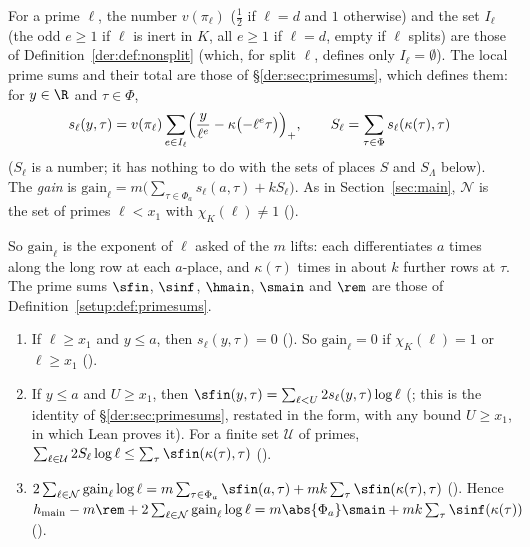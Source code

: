 \begin{definition}
\label{ub-divis:def:gain}
For a prime $\ell$, the number $v(\pi_\ell)$ ($\frac12$ if $\ell=d$ and $1$ otherwise) and the set
$I_\ell$ (the odd $e\ge1$ if $\ell$ is inert in $K$, all $e\ge1$ if $\ell=d$, empty if $\ell$ splits)
are those of Definition~\ref{der:def:nonsplit} (which, for split $\ell$, defines only $I_\ell=\emptyset$).
The local prime sums and their total are those of
\S\ref{der:sec:primesums}, which defines them: for $y\in\R$ and $\tau\in\Phi$,
\[
s_\ell(y,\tau)=v(\pi_\ell)\sum_{e\in I_\ell}\Bigl(\frac{y}{\ell^e}-\kappa\bigl(-\ell^e\tau\bigr)\Bigr)_+,
\qquad S_\ell=\sum_{\tau\in\Phi}s_\ell(\kappa(\tau),\tau)
\]
($S_\ell$ is a number; it has nothing to do with the sets of places $S$ and $S_\Lambda$ below). The
\emph{gain} is $\mathrm{gain}_\ell=m\bigl(\sum_{\tau\in\Phi_a}s_\ell(a,\tau)+kS_\ell\bigr)$. As in
Section~\ref{sec:main}, $\mathcal N$ is the set of primes $\ell<x_1$ with $\chi_K(\ell)\ne1$
().
\end{definition}

So $\mathrm{gain}_\ell$ is the exponent of $\ell$ asked of the $m$ lifts: each differentiates $a$ times along the long
row at each $a$-place, and $\kappa(\tau)$ times in about $k$ further rows at $\tau$. The prime
sums $\sfin$, $\sinf$, $\hmain$, $\smain$ and $\rem$ are those of Definition~\ref{setup:def:primesums}.

\begin{lemma}\label{ub-divis:lem:primesums}
\begin{enumerate}[label=(\alph*)]
\item If $\ell\ge x_1$ and $y\le a$, then $s_\ell(y,\tau)=0$ (). So $\mathrm{gain}_\ell=0$ if $\chi_K(\ell)=1$
  or $\ell\ge x_1$ ().
\item If $y\le a$ and $U\ge x_1$, then $\sfin(y,\tau)=\sum_{\ell<U}2s_\ell(y,\tau)\log \ell$
  (; this is the identity of \S\ref{der:sec:primesums},
  restated in the form, with any bound $U\ge x_1$, in which Lean proves it). For a finite set
  $\mathcal U$ of primes, $\sum_{\ell\in\mathcal U}2S_\ell\log \ell\le\sum_\tau\sfin(\kappa(\tau),\tau)$
  ().
\item $2\sum_{\ell\in\mathcal N}\mathrm{gain}_\ell\log \ell=m\sum_{\tau\in\Phi_a}\sfin(a,\tau)
  +mk\sum_\tau\sfin(\kappa(\tau),\tau)$ (). Hence
  $h_{\mathrm{main}}-m\rem+2\sum_{\ell\in\mathcal N}\mathrm{gain}_\ell\log
  \ell=m\abs{\Phi_a}\smain+mk\sum_\tau\sinf(\kappa(\tau))$
  ().
\end{enumerate}
\end{lemma}


